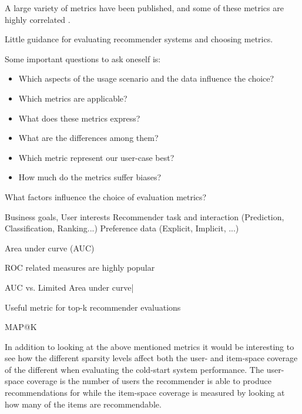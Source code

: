 
	
A large variety of metrics have been published, and some of these metrics are highly correlated \cite{Herlocker2004}.

Little guidance for evaluating recommender systems and choosing metrics.

Some important questions to ask oneself is:

\begin{itemize}
	\item Which aspects of the usage scenario and the data influence the choice?
	\item Which metrics are applicable?
	\item What does these metrics express?
	\item What are the differences among them?
	\item Which metric represent our user-case best?
	\item How much do the metrics suffer biases?
\end{itemize}

What factors influence the choice of evaluation metrics?

Business goals, User interests
Recommender task and interaction (Prediction, Classification, Ranking...)
Preference data (Explicit, Implicit, ...)

Area under curve (AUC)

ROC related measures are highly popular \cite{Agarwal2009, Gantner2010, Schein2002, Liu2011, Gantner2010}

AUC vs. Limited Area under curve|

Useful metric for top-k recommender evaluations

MAP@K




In addition to looking at the above mentioned metrics it would be interesting to see how
the different sparsity levels affect both the user- and item-space coverage of the different
when evaluating the cold-start system performance. The user-space coverage is the number of
users the recommender is able to produce recommendations for while the item-space
coverage is measured by looking at how many of the items are recommendable.



